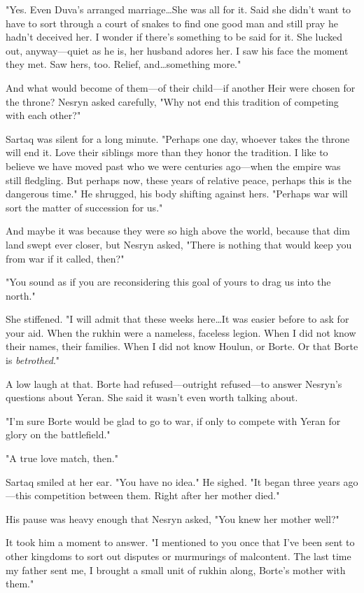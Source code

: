 "Yes.
Even Duva's arranged marriage\ldots She was all for it.
Said she didn't want to have to sort through a court of snakes to find one good man and still pray he hadn't deceived her.
I wonder if there's something to be said for it.
She lucked out, anyway---quiet as he is, her husband adores her.
I saw his face the moment they met.
Saw hers, too.
Relief, and\ldots something more."

And what would become of them---of their child---if another Heir were chosen for the throne?
Nesryn asked carefully, "Why not end this tradition of competing with each other?"

Sartaq was silent for a long minute.
"Perhaps one day, whoever takes the throne will end it.
Love their siblings more than they honor the tradition.
I like to believe we have moved past who we were centuries ago---when the empire was still fledgling.
But perhaps now, these years of relative peace, perhaps this is the dangerous time."
He shrugged, his body shifting against hers.
"Perhaps war will sort the matter of succession for us."

And maybe it was because they were so high above the world, because that dim land swept ever closer, but Nesryn asked, "There is nothing that would keep you from war if it called, then?"

"You sound as if you are reconsidering this goal of yours to drag us into the north."

She stiffened.
"I will admit that these weeks here\ldots It was easier before to ask for your aid.
When the rukhin were a nameless, faceless legion.
When I did not know their names, their families.
When I did not know Houlun, or Borte.
Or that Borte is \emph{betrothed}."

A low laugh at that.
Borte had refused---outright refused---to answer Nesryn's questions about Yeran.
She said it wasn't even worth talking about.

"I'm sure Borte would be glad to go to war, if only to compete with Yeran for glory on the battlefield."

"A true love match, then."

Sartaq smiled at her ear.
"You have no idea."
He sighed.
"It began three years ago---this competition between them.
Right after her mother died."

His pause was heavy enough that Nesryn asked, "You knew her mother well?"

It took him a moment to answer.
"I mentioned to you once that I've been sent to other kingdoms to sort out disputes or murmurings of malcontent.
The last time my father sent me, I brought a small unit of rukhin along, Borte's mother with them."

